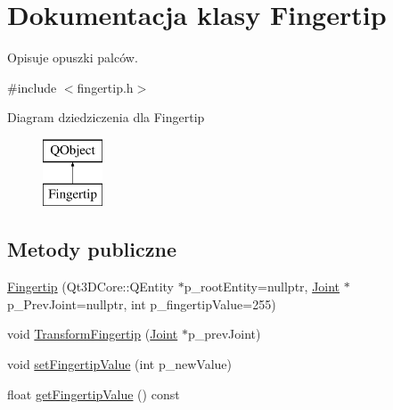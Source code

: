 \hypertarget{class_fingertip}{}\section{Dokumentacja klasy Fingertip}
\label{class_fingertip}


Opisuje opuszki palców.  




{\ttfamily \#include $<$fingertip.\+h$>$}

Diagram dziedziczenia dla Fingertip\begin{figure}[H]
\begin{center}
\leavevmode
\includegraphics[height=2.000000cm]{class_fingertip}
\end{center}
\end{figure}
\subsection*{Metody publiczne}
\begin{DoxyCompactItemize}
\item 
\hyperlink{class_fingertip_a06e4298ae73d30fb187a24d0830d230a}{Fingertip} (Qt3\+D\+Core\+::\+Q\+Entity $\ast$p\+\_\+root\+Entity=nullptr, \hyperlink{class_joint}{Joint} $\ast$p\+\_\+\+Prev\+Joint=nullptr, int p\+\_\+fingertip\+Value=255)
\item 
void \hyperlink{class_fingertip_aeecbae45b84b2ab9840df15b6541a21d}{Transform\+Fingertip} (\hyperlink{class_joint}{Joint} $\ast$p\+\_\+prev\+Joint)
\item 
void \hyperlink{class_fingertip_aa2823945458eb8a97f9568934bfcc1d5}{set\+Fingertip\+Value} (int p\+\_\+new\+Value)
\item 
float \hyperlink{class_fingertip_a3ec55016e28f9fbce847baa668c44868}{get\+Fingertip\+Value} () const
\end{DoxyCompactItemize}
